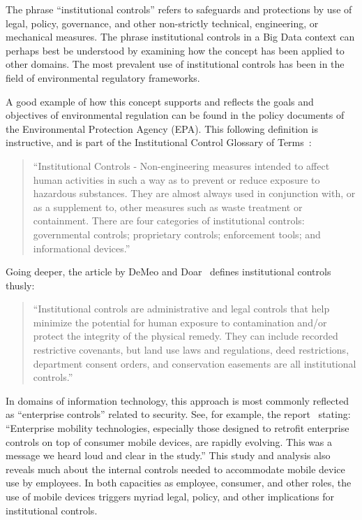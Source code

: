 The phrase ``institutional controls'' refers to safeguards and protections by use of legal, policy, governance, and other non-strictly technical, engineering, or mechanical measures.
The phrase institutional controls in a Big Data context can perhaps best be understood by examining how the concept has been applied to other domains.
The most prevalent use of institutional controls has been in the field of environmental regulatory frameworks.

A good example of how this concept supports and reflects the goals and objectives of environmental regulation can be found in the policy documents of the Environmental Protection Agency (EPA).
This following definition is instructive, and is part of the Institutional Control Glossary of Terms~\cite{EPA2007}:
\begin{quote}
``Institutional Controls - Non-engineering measures intended to affect human activities in such a way as to prevent or reduce exposure to hazardous substances. They are almost always used in conjunction with, or as a supplement to, other measures such as waste treatment or containment. There are four categories of institutional controls: governmental controls; proprietary controls; enforcement tools; and informational devices.''
\end{quote}

Going deeper, the article by DeMeo and Doar~\cite{DeMeo2011} defines institutional controls thusly:
\begin{quote}
``Institutional controls are administrative and legal controls that help minimize the potential for human exposure to contamination and/or protect the integrity of the physical remedy. They can include recorded restrictive covenants, but land use laws and regulations, deed restrictions, department consent orders, and conservation easements are all institutional controls.''
\end{quote}

In domains of information technology, this approach is most commonly reflected as ``enterprise controls'' related to security.
See, for example, the report~\cite{Juniper2012} stating: ``Enterprise mobility technologies, especially those designed to retrofit enterprise controls on top of consumer mobile devices, are rapidly evolving. This was a message we heard loud and clear in the study.''
This study and analysis also reveals much about the internal controls needed to accommodate mobile device use by employees.
In both capacities as employee, consumer, and other roles, the use of mobile devices triggers myriad legal, policy, and other implications for institutional controls.

